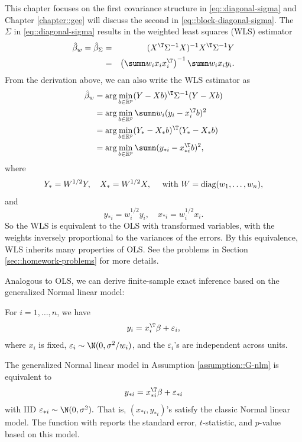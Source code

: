 This chapter focuses on the first covariance structure in \eqref{eq::diagonal-sigma} and Chapter \ref{chapter::gee} will discuss the second in \eqref{eq::block-diagonal-sigma}.  The $\Sigma$ in \eqref{eq::diagonal-sigma} results in the weighted least squares (WLS) estimator
\begin{eqnarray*}
\hat{\beta}_{w}  =\hat{\beta}_{\Sigma}
&=& (X^{\T}\Sigma^{-1}X)^{-1}X^{\T}\Sigma^{-1}Y \\
&=&\left(\sumn w_{i}x_{i}x_{i}^{\T}\right)^{-1}\sumn w_{i}x_{i}y_{i}.
\end{eqnarray*}
From the derivation above, we can also write the WLS estimator as
\begin{align*}
\hat{\beta}_{w}  
 & =\arg\min_{b\in \mathbb{R}^p}(Y-Xb)^{\T}\Sigma^{-1}(Y-Xb) \\
&  =\arg\min_{b\in \mathbb{R}^p}\sumn w_{i}(y_{i}-x_{i}^{\T}b)^{2}\\
  &=\arg\min_{b\in \mathbb{R}^p}( Y_*  - X_*  b)^{\T} ( Y_* -  X_* b)  \\
&  =\arg\min_{b\in \mathbb{R}^p}\sumn( y_{*i}  -x_{*i}^{\T} b)^{2},
\end{align*}
where
$$
Y_* = W^{1/2}Y, \quad   X_* = W^{1/2} X, \quad \textup{ with } W = \textup{diag}(w_1, \ldots, w_n),
$$
and
$$
y_{*i} =w_{i}^{1/2}y_{i},\quad x_{*i} =w_{i}^{1/2}x_{i} . 
$$
So the WLS is equivalent to the OLS with transformed variables, with the weights inversely proportional to the variances of the errors. 
By this equivalence, WLS inherits many properties of OLS. See the problems in Section \ref{sec::homework-problems} for more details. 


 

Analogous to OLS, we can derive finite-sample exact inference based on the generalized Normal linear model:

\begin{assumption}
\label{assumption::G-nlm}
For $i=1, \ldots, n$, we have 
$$
y_{i}=x_{i}^{\T}\beta+\varepsilon_{i} ,
$$
where $x_i$ is fixed, $\varepsilon_{i} \sim \N(0, \sigma^2/w_i)$, and the $\varepsilon_{i}$'s are independent across units.  
\end{assumption}


The generalized Normal linear model in Assumption \ref{assumption::G-nlm} is equivalent to 
$$
y_{*i} = x_{*i}^{\T}\beta+ \varepsilon_{*i}
$$
with IID $\varepsilon_{*i} \sim \N(0, \sigma^2).$ That is, $(x_{*i}, y_{*i})$'s satisfy the classic Normal linear model.  
The  function with  reports the standard error, $t$-statistic, and $p$-value based on this model. 


